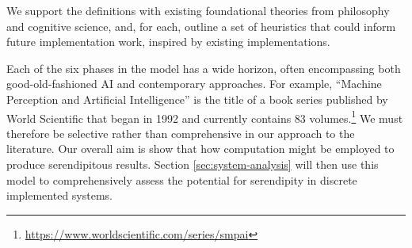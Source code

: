 We support the definitions with existing foundational theories from
philosophy and cognitive science, and, for each, outline a set of
heuristics that could inform future implementation work, inspired by
existing implementations.

Each of the six phases in the model has a wide
horizon, often encompassing both good-old-fashioned AI and contemporary approaches. For example, ``Machine Perception and Artificial Intelligence'' is the title of a book series published by World Scientific that began in 1992 and currently contains 83 volumes.\footnote{\url{https://www.worldscientific.com/series/smpai}}
We must therefore be selective rather than comprehensive in our
approach to the literature. 
Our overall aim is show that how computation might be employed to
produce serendipitous results.  Section \ref{sec:system-analysis} will
then use this model to comprehensively assess the potential for
serendipity in discrete implemented systems.

